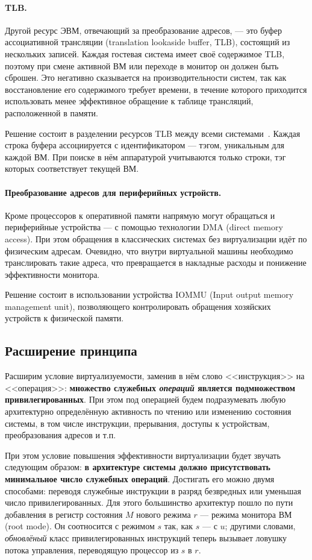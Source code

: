 \paragraph{TLB.} Другой ресурс ЭВМ, отвечающий за преобразование адресов, --- это буфер ассоциативной трансляции (\abbr translation lookaside buffer, TLB), состоящий из нескольких записей. Каждая гостевая система имеет своё содержимое TLB, поэтому при смене активной ВМ или переходе в монитор он должен быть сброшен. Это негативно сказывается на производительности систем, так как восстановление его содержимого требует времени, в течение которого приходится использовать менее эффективное обращение к таблице трансляций, расположенной в памяти.

Решение состоит в разделении ресурсов TLB между всеми системами~\cite{YANG:2008}. Каждая строка буфера ассоциируется с идентификатором --- тэгом, уникальным для каждой ВМ. При поиске в нём аппаратурой учитываются только строки, тэг которых соответствует текущей ВМ.

\paragraph{Преобразование адресов для периферийных устройств.} Кроме процессоров к оперативной памяти напрямую могут обращаться и периферийные устройства ---  с помощью технологии DMA (\abbr direct memory access). При этом обращения в классических системах без виртуализации идёт по физическим адресам. Очевидно, что внутри виртуальной машины необходимо транслировать такие адреса, что превращается в накладные расходы и понижение эффективности монитора. 

Решение состоит в использовании устройства IOMMU (\abbr Input output memory management unit), позволяющего контролировать обращения хозяйских устройств к физической памяти. 

\subsection{Расширение принципа}

Расширим условие виртуализуемости, заменив в нём слово <<инструкция>> на <<операция>>: \textbf{множество служебных \emph{операций} является подмножеством привилегированных}. При этом под операцией будем подразумевать любую архитектурно определённую активность по чтению или изменению состояния системы, в том числе инструкции, прерывания, доступы к устройствам, преобразования адресов и т.п.

При этом условие повышения эффективности виртуализации будет звучать следующим образом: \textbf{в архитектуре системы должно присутствовать минимальное число служебных операций}. Достигать его можно двумя способами: переводя служебные инструкции в разряд безвредных или уменьшая число привилегированных. Для этого большинство архитектур пошло по пути добавления в регистр состояния $M$ нового режима $r$ --- режима монитора ВМ (\abbr root mode). Он соотносится с режимом $s$ так, как $s$ --- с $u$; другими словами, \emph{обновлёный} класс привилегированных инструкций теперь вызывает ловушку потока управления, переводящую процессор из $s$ в $r$.

